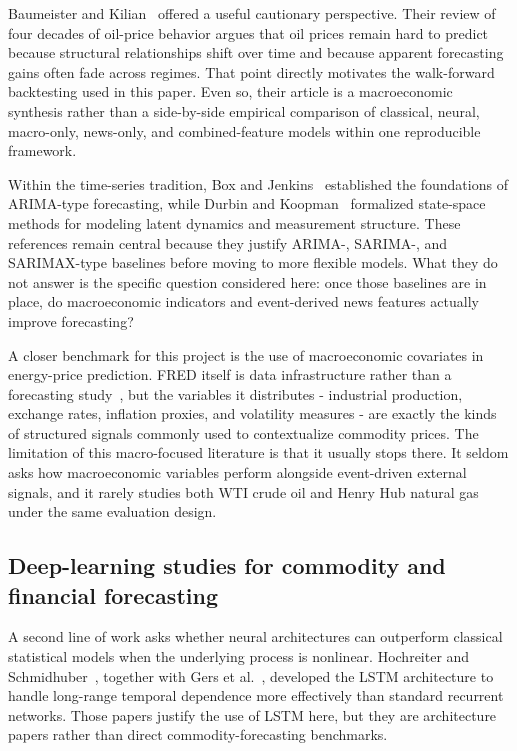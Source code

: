 \documentclass[pdflatex,sn-mathphys-num]{sn-jnl}%
\theoremstyle{thmstyleone}%
\theoremstyle{thmstyletwo}%
\theoremstyle{thmstylethree}%
\begin{document}
Baumeister and Kilian~\cite{baumeister2016} offered a useful cautionary perspective. Their review of four decades of oil-price behavior argues that oil prices remain hard to predict because structural relationships shift over time and because apparent forecasting gains often fade across regimes. That point directly motivates the walk-forward backtesting used in this paper. Even so, their article is a macroeconomic synthesis rather than a side-by-side empirical comparison of classical, neural, macro-only, news-only, and combined-feature models within one reproducible framework.

Within the time-series tradition, Box and Jenkins~\cite{box1976} established the foundations of ARIMA-type forecasting, while Durbin and Koopman~\cite{durbin2012} formalized state-space methods for modeling latent dynamics and measurement structure. These references remain central because they justify ARIMA-, SARIMA-, and SARIMAX-type baselines before moving to more flexible models. What they do not answer is the specific question considered here: once those baselines are in place, do macroeconomic indicators and event-derived news features actually improve forecasting?

A closer benchmark for this project is the use of macroeconomic covariates in energy-price prediction. FRED itself is data infrastructure rather than a forecasting study~\cite{fred2025}, but the variables it distributes - industrial production, exchange rates, inflation proxies, and volatility measures - are exactly the kinds of structured signals commonly used to contextualize commodity prices. The limitation of this macro-focused literature is that it usually stops there. It seldom asks how macroeconomic variables perform alongside event-driven external signals, and it rarely studies both WTI crude oil and Henry Hub natural gas under the same evaluation design.

\subsection*{Deep-learning studies for commodity and financial forecasting}
A second line of work asks whether neural architectures can outperform classical statistical models when the underlying process is nonlinear. Hochreiter and Schmidhuber~\cite{hochreiter1997}, together with Gers et al.~\cite{gers2000}, developed the LSTM architecture to handle long-range temporal dependence more effectively than standard recurrent networks. Those papers justify the use of LSTM here, but they are architecture papers rather than direct commodity-forecasting benchmarks.
\end{document}
